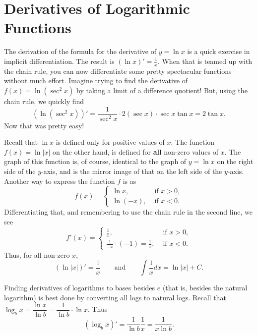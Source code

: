 \section{Derivatives of Logarithmic Functions}

The derivation of the formula for the derivative of $y=\ln x$
is a quick exercise in implicit
differentiation. The result is $(\ln x)'=\frac1x$.
When that is teamed up with the chain rule,
you can now differentiate some pretty
spectacular functions without much effort. Imagine trying to find the
derivative of $f(x) = \ln(\sec^2x)$ by taking a limit of a difference
quotient! But, using the chain rule, we quickly find
\[
 \left(\ln(\sec^2x)\right)'=\frac1{\sec^2x}\cdot2(\sec x)\cdot\sec x\tan x
 =2\tan x.
\]
Now that was pretty easy!

Recall that $\ln x$ is defined only for positive values of $x$.
The function $f(x)=\ln\lvert x\rvert$ on the other hand, is defined for \textbf{all}
non-zero values of $x$. The graph of this function is, of course,
identical to the graph of $y=\ln x$ on the right side of the $y$-axis,
and is the mirror image of that on the left side of the $y$-axis.
Another way to express the function $f$ is as
\[
 f(x)=\begin{cases}
  \ln x, &\text{ if }x>0,\\
  \ln (-x), &\text{ if }x<0.
 \end{cases}
\]
Differentiating that, and remembering to use the chain rule in the second
line, we see
\[
 f'(x)=\begin{cases}
  \frac1x, &\text{ if }x>0,\\
  \frac1{-x}\cdot(-1)=\frac1x, &\text{ if }x<0.
 \end{cases}
\]
Thus, for all non-zero $x$,
\begin{equation}
 (\ln\lvert x\rvert)'=\frac1x\qquad\text{and}\qquad\int\frac1x dx=\ln\lvert x\rvert+C.
\end{equation}

Finding derivatives of logarithms to bases besides $e$ (that is,
besides the natural logarithm) is best done by converting all logs to
natural logs. Recall that
$\log_b x=\dfrac{\ln x}{\ln b}=\dfrac1{\ln b}\cdot\ln x$.
Thus
\begin{equation}(\log_b x)'=\frac1{\ln b}\frac1x=\frac1{x\ln b}.\end{equation}

